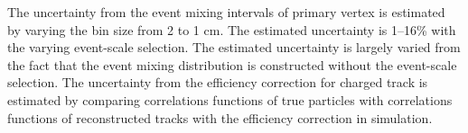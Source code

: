 The uncertainty from the event mixing intervals of primary vertex is estimated by varying the bin size from 2 to 1 cm. The estimated uncertainty is 1--16\% with the varying event-scale selection. The estimated uncertainty is largely varied from the fact that the event mixing distribution is constructed without the event-scale selection. The uncertainty from the efficiency correction for charged track is estimated by comparing correlations functions of true particles with correlations functions of reconstructed tracks with the efficiency correction in simulation. 






\iffalse



